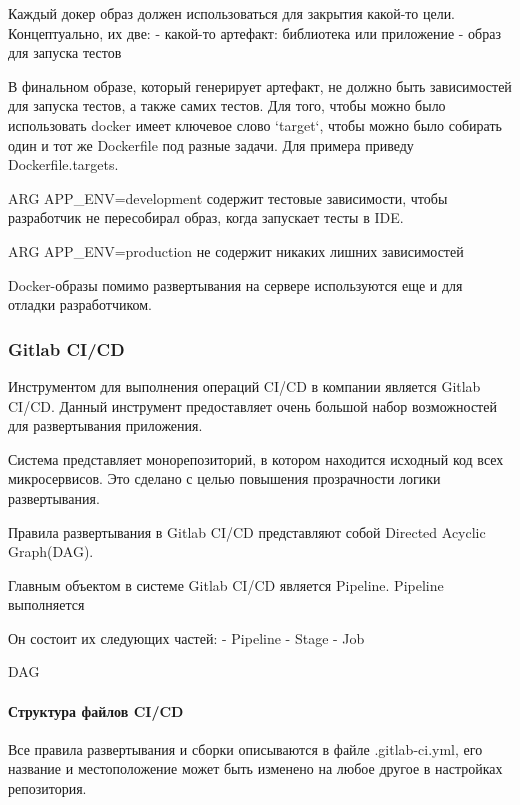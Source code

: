 Каждый докер образ должен использоваться для закрытия какой-то цели. Концептуально, их две:
- какой-то артефакт: библиотека или приложение
- образ для запуска тестов

В финальном образе, который генерирует артефакт, не должно быть зависимостей для запуска тестов,
а также самих тестов.
Для того, чтобы можно было использовать docker имеет ключевое слово `target`, чтобы можно было собирать один
и тот же Dockerfile под разные задачи. Для примера приведу Dockerfile.targets.

ARG APP\_ENV=development содержит тестовые зависимости, чтобы разработчик не пересобирал образ, когда запускает тесты
в IDE.

ARG APP\_ENV=production не содержит никаких лишних зависимостей

Docker-образы помимо развертывания на сервере используются еще и для отладки разработчиком.



\subsubsection{{Gitlab CI/CD}}

Инструментом для выполнения операций CI/CD в компании является Gitlab CI/CD.
Данный инструмент предоставляет очень большой набор возможностей для развертывания приложения.

Система представляет монорепозиторий, в котором находится исходный код всех микросервисов.
Это сделано с целью повышения прозрачности логики развертывания.






Правила развертывания в Gitlab CI/CD представляют собой Directed Acyclic Graph(DAG).

Главным объектом в системе Gitlab CI/CD является Pipeline.
Pipeline выполняется



Он состоит их следующих частей:
- Pipeline
- Stage
- Job

DAG

\paragraph{Структура файлов CI/CD}

Все правила развертывания и сборки описываются в файле .gitlab-ci.yml,
его название и местоположение может быть изменено на любое другое в настройках репозитория.

